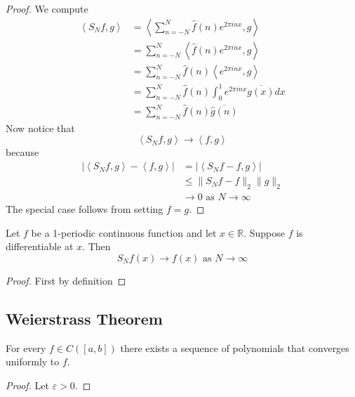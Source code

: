 \documentclass[11pt]{article}
\numberwithin{equation}{section}
\theoremstyle{definition}
\theoremstyle{definition}
\newcommand\angles[1]{\left\langle #1 \right\rangle}
\newcommand\abs[1]{\left| #1 \right|}
\newcommand\norm[1]{\lVert#1\rVert}
\newcommand{\1}{\mathbbm 1}
\newcommand{\e}{\varepsilon}
\newcommand{\RR}{\mathbb R}
\begin{document}
\begin{proof}
	We compute
	\begin{align*}
		\angles{S_N f, g} &= \angles{\sum_{n=-N}^N \hat{f}(n) e^{2\pi i n x}, g} \\
		&= \sum_{n=-N}^N \angles{\hat{f}(n) e^{2\pi i n x}, g} \\
		&= \sum_{n=-N}^N \hat{f}(n) \angles{e^{2\pi i n x}, g} \\
		&= \sum_{n=-N}^N \hat{f}(n) \int_0^1 e^{2\pi i n x} \overline{g(x)} dx \\
		&= \sum_{n=-N}^N \hat{f}(n) \overline{\hat{g}(n)}
	\end{align*}
	Now notice that
	\begin{equation}
		\angles{S_N f, g} \to \angles{f,g}
	\end{equation}
	because
	\begin{align*}
		\abs{\angles{S_N f, g} - \angles{f,g}} &= \abs{\angles{S_N f - f, g}} \\
		&\leq \norm{S_N f - f}_2 \norm{g}_2 \tag{Cauchy-Schwarz} \\
		&\to 0 \text{ as } N \to \infty \tag{previous theorem} 
	\end{align*}
	The special case follows from setting $f=g$. 
\end{proof}


\begin{theorem}[]
	Let $f$ be a 1-periodic continuous function and let $x \in \RR$. Suppose $f$ is differentiable at $x$. Then 
	\begin{equation}
		S_N f(x) \to f(x) \text{ as } N \to \infty
	\end{equation}
\end{theorem}
\begin{proof}
	First by definition
\end{proof}



\subsection{Weierstrass Theorem}

\begin{theorem}
	For every $f \in C([a,b])$ there exists a sequence of polynomials that converges uniformly to $f$. 
\end{theorem}
\begin{proof}
	Let $\e > 0$. 

\end{proof}
\end{document}
